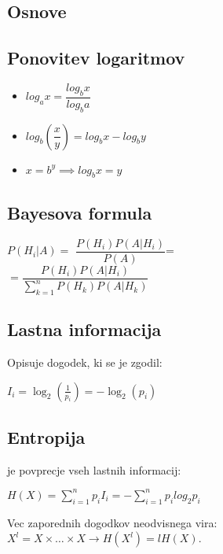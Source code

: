 \documentclass{article}
\begin{document}
\begin{multicols}{4}

\section{Osnove}


\subsection{Ponovitev logaritmov}
\begin{small}
    \begin{itemize} 
        \item $log_a x = \dfrac{log_b x}{log_b a}$
        \item $log_b(\dfrac{x}{y}) = log_b x - log_b y$
        \item $x = b^y \implies log_b x = y$
    \end{itemize}
\end{small}

\subsection{Bayesova formula}
\begin{center}
    \begin{math}
        P(H_{i} | A) = 
    \end{math}
    \begin{math}
        \dfrac{P(H_{i}) P(A | H_{i})}{P(A)}
    \end{math}=\\
    \begin{math}
        = \dfrac{P(H_{i}) P(A | H_{i})}{\sum_{k=1}^{n} P(H_{k}) P(A | H_{k})}
    \end{math}        
\end{center}

\subsection{Lastna informacija}
Opisuje dogodek, ki se je zgodil:
\begin{center}
    \begin{math}
        I_i = \log_2(\frac{1}{p_i}) = - \log_2(p_i)
    \end{math}
\end{center}

\subsection{Entropija}
je povprecje vseh lastnih informacij:
\begin{center}
    \begin{math}
        H(X) = \sum_{i=1}^{n} p_i I_i = -\sum_{i=1}^{n} p_i log_2 p_i
    \end{math}
\end{center}
Vec zaporednih dogodkov neodvisnega vira: $X^l = X \times \dots \times X \rightarrow H(X^l) = lH(X)$.


\end{multicols}
\end{document}
